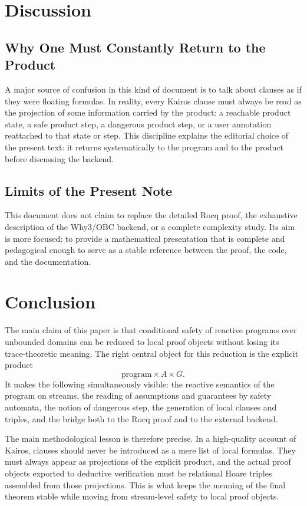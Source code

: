 \documentclass[11pt,a4paper]{article}
\begin{document}
\section{Discussion}

\subsection{Why One Must Constantly Return to the Product}

A major source of confusion in this kind of document is to talk about
clauses as if they were floating formulas. In reality, every Kairos
clause must always be read as the projection of some information carried by
the product: a reachable product state, a safe product step, a dangerous
product step, or a user annotation reattached to that state or step.
This discipline explains the editorial choice of the present text: it returns
systematically to the program and to the product before discussing the backend.

\subsection{Limits of the Present Note}

This document does not claim to replace the detailed Rocq proof, the
exhaustive description of the Why3/OBC backend, or a complete complexity
study.
Its aim is more focused: to provide a mathematical presentation that is complete
and pedagogical enough to serve as a stable reference between the proof, the
code, and the documentation.

\section{Conclusion}

The main claim of this paper is that conditional safety of reactive programs
over unbounded domains can be reduced to local proof objects without losing its
trace-theoretic meaning. The right central object for this reduction is the explicit product
\[
\text{program} \times A \times G.
\]
It makes the following simultaneously visible:
the reactive semantics of the program on streams, the reading of assumptions
and guarantees by safety automata, the notion of dangerous step, the
generation of local clauses and triples, and the bridge both to the Rocq proof
and to the external backend.

The main methodological lesson is therefore precise. In a high-quality account
of Kairos, clauses should never be introduced as a mere list of local formulas.
They must always appear as projections of the explicit product, and the actual
proof objects exported to deductive verification must be relational Hoare
triples assembled from those projections. This is what keeps the meaning of the
final theorem stable while moving from stream-level safety to local proof
objects.
\end{document}
